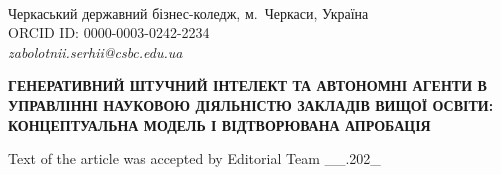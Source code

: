 \documentclass[12pt,a4paper]{article}
\begin{document}

\vspace{0.5em}
\\
{\fontsize{10}{12}\selectfont Черкаський державний бізнес-коледж, м.~Черкаси, Україна}\\
{\fontsize{10}{12}\selectfont ORCID ID: 0000-0003-0242-2234}\\
{\fontsize{10}{12}\selectfont\textit{zabolotnii.serhii@csbc.edu.ua}}

\vspace{1em}

\begin{center}
{\bfseries\fontsize{12}{14}\selectfont ГЕНЕРАТИВНИЙ ШТУЧНИЙ ІНТЕЛЕКТ ТА АВТОНОМНІ АГЕНТИ В УПРАВЛІННІ НАУКОВОЮ ДІЯЛЬНІСТЮ ЗАКЛАДІВ ВИЩОЇ ОСВІТИ: КОНЦЕПТУАЛЬНА МОДЕЛЬ І ВІДТВОРЮВАНА АПРОБАЦІЯ}
\end{center}

\vspace{1em}









\clearpage


\clearpage


\clearpage
\begin{flushright}
{\fontsize{10}{12}\selectfont Text of the article was accepted by Editorial Team \_\_.202\_}
\end{flushright}
\end{document}
